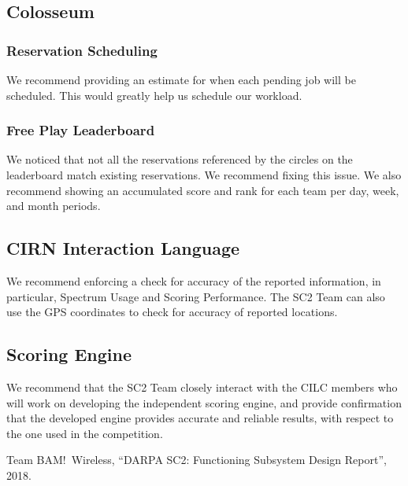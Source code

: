 \documentclass[11pt]{article}
\begin{document}
\subsection{Colosseum}
\subsubsection{Reservation Scheduling}
We recommend providing an estimate for when each pending job will be scheduled. This would greatly help us schedule our workload.
\subsubsection{Free Play Leaderboard}
We noticed that not all the reservations referenced by the circles on the leaderboard match existing reservations. We recommend fixing this issue. We also recommend showing an accumulated score and rank for each team per day, week, and month periods.
\subsection{CIRN Interaction Language}
We recommend enforcing a check for accuracy of the reported information, in particular, Spectrum Usage and Scoring Performance. The SC2 Team can also use the GPS coordinates to check for accuracy of reported locations.
\subsection{Scoring Engine}
We recommend that the SC2 Team closely interact with the CILC members who will work on developing the independent scoring engine, and provide confirmation that the developed engine provides accurate and reliable results, with respect to the one used in the competition.
\begin{thebibliography}{2}
 Team BAM!\ Wireless, ``DARPA SC2: Functioning Subsystem Design Report'', 2018.
 \end{thebibliography}
\end{document}
